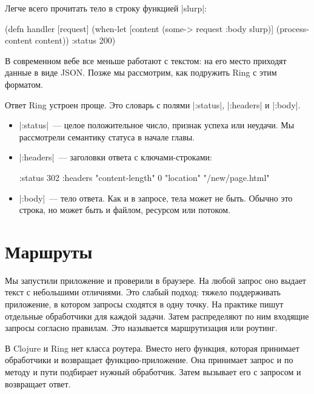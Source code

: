 Легче всего прочитать тело в строку функцией \spverb|slurp|:

\begin{english}
  \begin{clojure}
(defn handler [request]
  (when-let [content (some-> request :body slurp)]
    (process-content content))
  {:status 200})
  \end{clojure}
\end{english}

В современном вебе все меньше работают с текстом: на его место приходят данные в
виде JSON. Позже мы рассмотрим, как подружить Ring с этим форматом.

Ответ Ring устроен проще. Это словарь с полями \spverb|:status|,
\spverb|:headers| и \spverb|:body|.

\begin{itemize}

\item
  \spverb|:status|~--- целое положительное число, признак успеха или неудачи. Мы
  рассмотрели семантику статуса в начале главы.

\item
  \spverb|:headers|~--- заголовки ответа с ключами-строками:

\begin{english}
  \begin{clojure}
{:status 302
 :headers {"content-length" 0
           "location" "/new/page.html"}}
  \end{clojure}
\end{english}

\item
  \spverb|:body|~--- тело ответа. Как и в запросе, тела может не быть. Обычно
  это строка, но может быть и файлом, ресурсом или потоком.

\end{itemize}

\section{Маршруты}

Мы запустили приложение и проверили в браузере. На любой запрос оно выдает текст
с небольшими отличиями. Это слабый подход: тяжело поддерживать приложение, в
котором запросы сходятся в одну точку. На практике пишут отдельные обработчики
для каждой задачи. Затем распределяют по ним входящие запросы согласно
правилам. Это называется маршрутизация или роутинг.

В Clojure и Ring нет класса роутера. Вместо него функция, которая принимает
обработчики и возвращает функцию-приложение. Она принимает запрос и по методу и
пути подбирает нужный обработчик. Затем вызывает его с запросом и возвращает
ответ.

